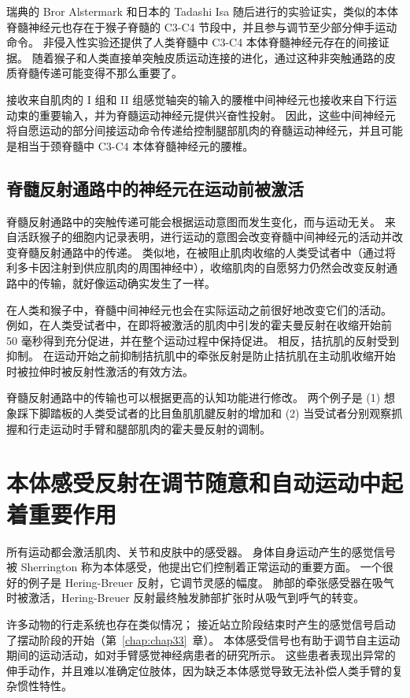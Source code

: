 瑞典的 Bror Alstermark 和日本的 Tadashi Isa 随后进行的实验证实，类似的本体脊髓神经元也存在于猴子脊髓的 C3-C4 节段中，并且参与调节至少部分伸手运动命令。
非侵入性实验还提供了人类脊髓中 C3-C4 本体脊髓神经元存在的间接证据。
随着猴子和人类直接单突触皮质运动连接的进化，通过这种非突触通路的皮质脊髓传递可能变得不那么重要了。


接收来自肌肉的 I 组和 II 组感觉轴突的输入的腰椎中间神经元也接收来自下行运动束的重要输入，并为脊髓运动神经元提供兴奋性投射。
因此，这些中间神经元将自愿运动的部分间接运动命令传递给控制腿部肌肉的脊髓运动神经元，并且可能是相当于颈脊髓中 C3-C4 本体脊髓神经元的腰椎。



\subsection{脊髓反射通路中的神经元在运动前被激活}

脊髓反射通路中的突触传递可能会根据运动意图而发生变化，而与运动无关。
来自活跃猴子的细胞内记录表明，进行运动的意图会改变脊髓中间神经元的活动并改变脊髓反射通路中的传递。
类似地，在被阻止肌肉收缩的人类受试者中（通过将利多卡因注射到供应肌肉的周围神经中），收缩肌肉的自愿努力仍然会改变反射通路中的传输，就好像运动确实发生了一样。


在人类和猴子中，脊髓中间神经元也会在实际运动之前很好地改变它们的活动。
例如，在人类受试者中，在即将被激活的肌肉中引发的霍夫曼反射在收缩开始前 50 毫秒得到充分促进，并在整个运动过程中保持促进。
相反，拮抗肌的反射受到抑制。
在运动开始之前抑制拮抗肌中的牵张反射是防止拮抗肌在主动肌收缩开始时被拉伸时被反射性激活的有效方法。


脊髓反射通路中的传输也可以根据更高的认知功能进行修改。
两个例子是 (1) 想象踩下脚踏板的人类受试者的比目鱼肌肌腱反射的增加和 (2) 当受试者分别观察抓握和行走运动时手臂和腿部肌肉的霍夫曼反射的调制。



\section{本体感受反射在调节随意和自动运动中起着重要作用}

所有运动都会激活肌肉、关节和皮肤中的感受器。
身体自身运动产生的感觉信号被 Sherrington 称为本体感受，他提出它们控制着正常运动的重要方面。
一个很好的例子是 Hering-Breuer 反射，它调节灵感的幅度。 肺部的牵张感受器在吸气时被激活，Hering-Breuer 反射最终触发肺部扩张时从吸气到呼气的转变。


许多动物的行走系统也存在类似情况；
接近站立阶段结束时产生的感觉信号启动了摆动阶段的开始（第~\ref{chap:chap33}~章）。
本体感受信号也有助于调节自主运动期间的运动活动，如对手臂感觉神经病患者的研究所示。
这些患者表现出异常的伸手动作，并且难以准确定位肢体，因为缺乏本体感觉导致无法补偿人类手臂的复杂惯性特性。


